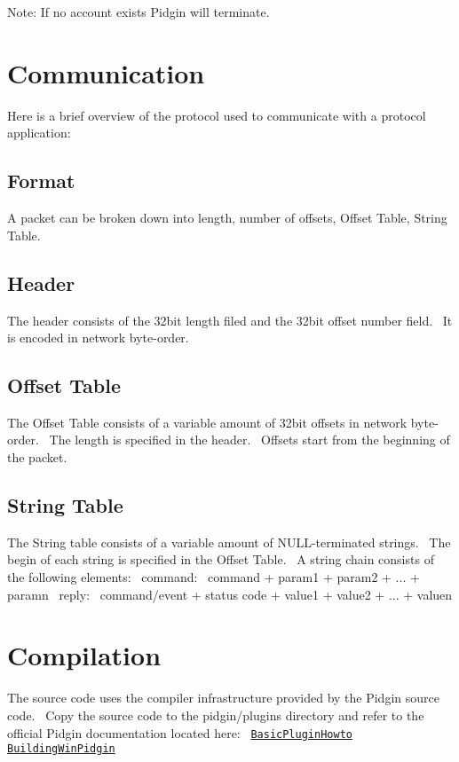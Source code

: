  Note\+: If no account exists Pidgin will terminate.\hypertarget{index_communication_sec}{}\section{Communication}\label{index_communication_sec}
Here is a brief overview of the protocol used to communicate with a protocol application\+:~\newline
\hypertarget{index_com1}{}\subsection{Format}\label{index_com1}
A packet can be broken down into length, number of offsets, Offset Table, String Table.\hypertarget{index_com2}{}\subsection{Header}\label{index_com2}
The header consists of the 32bit length filed and the 32bit offset number field.~\newline
 It is encoded in network byte-\/order.\hypertarget{index_com3}{}\subsection{Offset Table}\label{index_com3}
The Offset Table consists of a variable amount of 32bit offsets in network byte-\/order.~\newline
 The length is specified in the header.~\newline
 Offsets start from the beginning of the packet.\hypertarget{index_com4}{}\subsection{String Table}\label{index_com4}
The String table consists of a variable amount of N\+U\+L\+L-\/terminated strings.~\newline
 The begin of each string is specified in the Offset Table.~\newline
 A string chain consists of the following elements\+:~\newline
 command\+:~\newline
 command + param1 + param2 + ... + paramn~\newline
 reply\+:~\newline
 command/event + status code + value1 + value2 + ... + valuen\hypertarget{index_compilation_sec}{}\section{Compilation}\label{index_compilation_sec}
The source code uses the compiler infrastructure provided by the Pidgin source code.~\newline
 Copy the source code to the pidgin/plugins directory and refer to the official Pidgin documentation located here\+:~\newline
 \href{https://developer.pidgin.im/wiki/CHowTo/BasicPluginHowto}{\tt Basic\+Plugin\+Howto}~\newline
 \href{https://developer.pidgin.im/wiki/BuildingWinPidgin}{\tt Building\+Win\+Pidgin} 